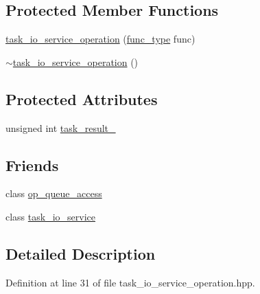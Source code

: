 \subsection*{Protected Member Functions}
\begin{DoxyCompactItemize}
\item 
\hyperlink{classasio_1_1detail_1_1_a_s_i_o___i_n_h_e_r_i_t___t_r_a_c_k_e_d___h_a_n_d_l_e_r_a1e458b6f5eadbe2c7a47bfb228979f90}{task\+\_\+io\+\_\+service\+\_\+operation} (\hyperlink{classasio_1_1detail_1_1_a_s_i_o___i_n_h_e_r_i_t___t_r_a_c_k_e_d___h_a_n_d_l_e_r_a424de9363d10315aa1db285d51219500}{func\+\_\+type} func)
\item 
\hyperlink{classasio_1_1detail_1_1_a_s_i_o___i_n_h_e_r_i_t___t_r_a_c_k_e_d___h_a_n_d_l_e_r_a7c63d0e2a73b6bc3e3874abab4ed7831}{$\sim$task\+\_\+io\+\_\+service\+\_\+operation} ()
\end{DoxyCompactItemize}
\subsection*{Protected Attributes}
\begin{DoxyCompactItemize}
\item 
unsigned int \hyperlink{classasio_1_1detail_1_1_a_s_i_o___i_n_h_e_r_i_t___t_r_a_c_k_e_d___h_a_n_d_l_e_r_ace541f4b74231dfbec980267b7639108}{task\+\_\+result\+\_\+}
\end{DoxyCompactItemize}
\subsection*{Friends}
\begin{DoxyCompactItemize}
\item 
class \hyperlink{classasio_1_1detail_1_1_a_s_i_o___i_n_h_e_r_i_t___t_r_a_c_k_e_d___h_a_n_d_l_e_r_a8e30c53833cb03dcfc31f84f66cd71c7}{op\+\_\+queue\+\_\+access}
\item 
class \hyperlink{classasio_1_1detail_1_1_a_s_i_o___i_n_h_e_r_i_t___t_r_a_c_k_e_d___h_a_n_d_l_e_r_ae26d8b46b33753dd4b3025c785d11b97}{task\+\_\+io\+\_\+service}
\end{DoxyCompactItemize}


\subsection{Detailed Description}


Definition at line 31 of file task\+\_\+io\+\_\+service\+\_\+operation.\+hpp.



